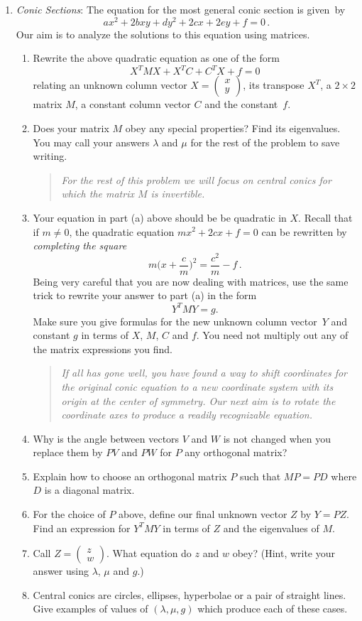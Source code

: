 \begin{enumerate}
\item{\it Conic Sections}: The equation for the most general conic section is given~by
$$
ax^2 + 2bxy+dy^2 + 2cx+2ey + f=0\, . 
$$
Our aim is to analyze the solutions to this equation using matrices.
\begin{enumerate}
\item \label{parta}Rewrite the above quadratic equation as one of the form $$X^T M X +  X^T C + C^T X+ f=0$$ relating an unknown column vector $X=\begin{pmatrix}x
 \\ y\end{pmatrix}$, its transpose $X^T$, a $2\times 2$ matrix $M$, a constant column vector $C$ and the  constant~$f$.
\item Does your matrix $M$ obey any special properties? Find its eigenvalues. You may call your answers $\lambda$ and $\mu$ for the rest of the problem to save writing.
\begin{quote}{\it For the rest of this problem we will focus on central conics for which the matrix $M$ is invertible.}\end{quote}
\item Your equation in part (a) above should be be quadratic in $X$. Recall that if $m\neq 0$, 
the quadratic equation $mx^2 + 2cx+f=0$ can be rewritten by {\it completing the square}
$$
m\Big(x+\frac cm\Big)^2 = \frac{c^2}{m}-f\, .
$$
Being very careful that you are now dealing with matrices, use the same trick to rewrite your answer to part (a) in the form
$$
Y^T M Y = g.
$$
Make sure you give formulas for the new unknown column vector~$Y$ and constant $g$ in terms of $X$, $M$, $C$ and $f$. You need not multiply out any of the matrix expressions you find.
\begin{quote}{\it 
If all has gone well, you have found a way to shift coordinates for the original conic equation
to a new coordinate system with its origin at the center of symmetry. Our next aim is to rotate the coordinate
axes to produce a readily recognizable equation.}
\end{quote}
\item Why is the angle between vectors $V$ and $W$ is not changed when you replace
them by $PV$ and $PW$ for $P$ any orthogonal matrix?
\item Explain how to choose an orthogonal  matrix $P$ such that $MP=PD$ where $D$ is a diagonal matrix.
\item For the choice of $P$ above, define our final unknown vector $Z$ by $Y=PZ$. Find an expression for $Y^T MY$ in terms of $Z$ and the eigenvalues of $M$.
\item Call $Z=\begin{pmatrix}z\\w\end{pmatrix}$. What equation do $z$ and $w$ obey?
(Hint, write your answer using $\lambda$, $\mu$ and $g$.)
\item Central conics are circles, ellipses, hyperbolae or a pair of straight lines. Give examples of values of 
$(\lambda,\mu,g)$ which produce each of these cases.


\end{enumerate}
\end{enumerate}
